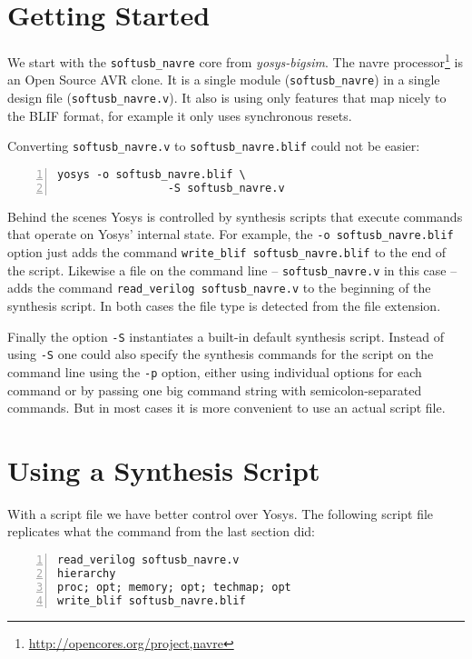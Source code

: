\section{Getting Started}

We start with the {\tt softusb\_navre} core from {\it yosys-bigsim}. The navre
processor\footnote{\url{http://opencores.org/project,navre}} is an Open Source
AVR clone. It is a single module ({\tt softusb\_navre}) in a single design file
({\tt softusb\_navre.v}). It also is using only features that map nicely to
the BLIF format, for example it only uses synchronous resets.

Converting {\tt softusb\_navre.v} to {\tt softusb\_navre.blif} could not be
easier:

\begin{lstlisting}[frame=trBL,xleftmargin=1.5em,numbers=left]
  yosys -o softusb_navre.blif \
                 -S softusb_navre.v
\end{lstlisting}

Behind the scenes Yosys is controlled by synthesis scripts that execute
commands that operate on Yosys' internal state. For example, the {\tt -o
softusb\_navre.blif} option just adds the command {\tt write\_blif
softusb\_navre.blif} to the end of the script. Likewise a file on the
command line -- {\tt softusb\_navre.v} in this case -- adds the command
{\tt read\_verilog softusb\_navre.v} to the beginning of the
synthesis script. In both cases the file type is detected from the
file extension.

Finally the option {\tt -S} instantiates a built-in default synthesis script.
Instead of using {\tt -S} one could also specify the synthesis commands
for the script on the command line using the {\tt -p} option, either using
individual options for each command or by passing one big command string
with semicolon-separated commands. But in most cases it is more convenient
to use an actual script file.

\section{Using a Synthesis Script}

With a script file we have better control over Yosys. The following script
file replicates what the command from the last section did:

\begin{lstlisting}[frame=trBL,xleftmargin=1.5em,numbers=left,caption={\tt softusb\_navre.ys}]
read_verilog softusb_navre.v
hierarchy
proc; opt; memory; opt; techmap; opt
write_blif softusb_navre.blif
\end{lstlisting}

